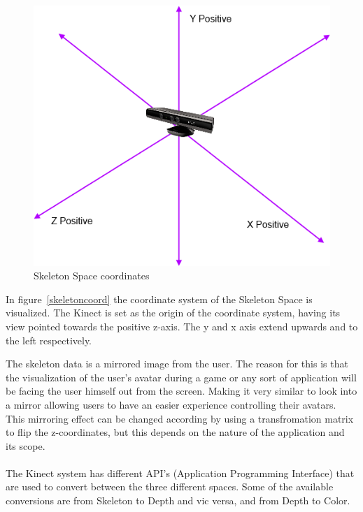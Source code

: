 \begin{figure}[!htbp]
\centering
\includegraphics{images/skeletoncoord.png}
\caption{Skeleton Space coordinates}
\label{skeltoncoord}
\end{figure}

In figure~\ref{skeletoncoord} the coordinate system of the Skeleton Space is visualized. The Kinect is set as the origin of the coordinate system, having its view pointed towards the positive z-axis. The y and x axis extend upwards and to the left respectively.

The skeleton data is a mirrored image from the user. The reason for this is that the visualization of the user's avatar during a game or any sort of application will be facing the user himself out from the screen. Making it very similar to look into a mirror allowing users to have an easier experience controlling their avatars. This mirroring effect can be changed according by using a transfromation matrix to flip the z-coordinates, but this depends on the nature of the application and its scope.
\\
\\
The Kinect system has different API's (Application Programming Interface) that are used to convert between the three different spaces. Some of the available conversions are from Skeleton to Depth and vic versa, and from Depth to Color.
